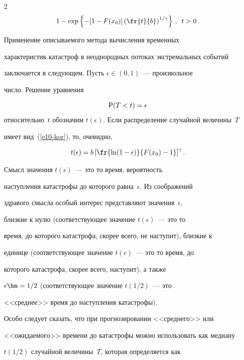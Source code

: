 \begin{multicols}{2}
\begin{multline}
1-\exp\left\{-[1-F(x_0)]\left(\fr{t}{b}\right)^{1/\gamma}\right\}\,,\enskip


t>0\,.\label{e10-kor}


\end{multline}





Применение описываемого метода вычисления временн$\acute{\mbox{ы}}$х


характеристик катастроф в неоднородных потоках экстремальных событий


заключается в следующем. Пусть $\epsilon\in(0,1)$~--- произвольное


число. Решение уравнения 


$$


{\sf P}(T<t)=\epsilon


$$ относительно~$t$ обозначим $t(\epsilon)$. Если распределение случайной величины~$T$


имеет вид~(\ref{e10-kor}), то, очевидно,


$$


t(\epsilon)=b\left[\fr{\ln(1-\epsilon)}{F(x_0)-1}\right]^{\gamma}.


$$





Смысл значения $t(\epsilon)$~--- это то время, вероятность


наступления катастрофы до которого равна~$\epsilon$. Из соображений


здравого смысла особый интерес представляют значения~$\epsilon$,


близкие к нулю (соответствующее значение $t(\epsilon)$~--- это то


время, до которого катастрофа, скорее всего, не наступит), близкие к


единице (соответствующее значение $t(\epsilon)$~--- это то время, до


которого катастрофа, скорее всего, наступит), а также


$\epsilon\hm=1/2$ (соответствующее значение $t(1/2)$~--- это


<<среднее>> время до наступления катастрофы).





Особо следует сказать, что при прогнозировании <<среднего>> или


<<ожидаемого>> времени до катастрофы можно использовать как медиану


$t(1/2)$ случайной величины~$T$, которая определяется как



\end{multicols}

